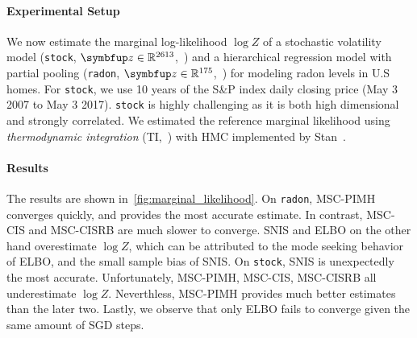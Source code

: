 \paragraph{Experimental Setup}
We now estimate the marginal log-likelihood \(\log Z\) of a stochastic volatility model (\texttt{stock}, \(\vz \in \mathbb{R}^{2613}\),~\citealt{kim_stochastic_1998}) and a hierarchical regression model with partial pooling (\texttt{radon}, \(\vz \in \mathbb{R}^{175}\),~\citealt{gelman_data_2007}) for modeling radon levels in U.S homes.
For \texttt{stock}, we use 10 years of the S\&P index daily closing price (May 3 2007 to May 3 2017).
\texttt{stock} is highly challenging as it is both high dimensional and strongly correlated.
We estimated the reference marginal likelihood using \textit{thermodynamic integration} (TI,~\citealt{gelman_simulating_1998, neal_annealed_2001, lartillot_computing_2006}) with HMC implemented by Stan~\citep{carpenter_stan_2017, betancourt_conceptual_2017}.

\vspace{-0.10in}
\paragraph{Results}
The results are shown in~\cref{fig:marginal_likelihood}.
On \texttt{radon}, MSC-PIMH converges quickly, and provides the most accurate estimate.
In contrast, MSC-CIS and MSC-CISRB are much slower to converge.
SNIS and ELBO on the other hand overestimate \(\log Z\), which can be attributed to the mode seeking behavior of ELBO, and the small sample bias of SNIS.
On \texttt{stock}, SNIS is unexpectedly the most accurate.
Unfortunately, MSC-PIMH, MSC-CIS, MSC-CISRB all underestimate \(\log Z\).
Neverthless, MSC-PIMH provides much better estimates than the later two.
Lastly, we observe that only ELBO fails to converge given the same amount of SGD steps.

